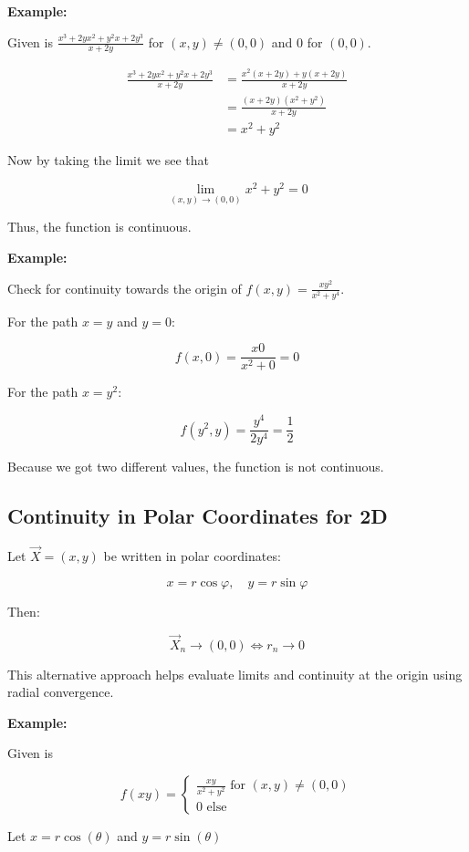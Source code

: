 \textbf{Example:}

Given is \(\frac{x^3 + 2yx^2 + y^2x + 2y^3}{x + 2y}\) for \((x,y) \ne (0,0)\) and \(0\) for \((0,0)\).

\begin{align*}
    \frac{x^3 + 2yx^2 + y^2x + 2y^3}{x + 2y} &= \frac{x^2(x + 2y) + y(x + 2y)}{x + 2y}\\
    &= \frac{(x + 2y)(x^2 + y^2)}{x + 2y}\\
    &= x^2 + y^2
\end{align*}

Now by taking the limit we see that

\[
    \lim_{(x,y) \to (0,0)} x^2 + y^2 = 0
\]

Thus, the function is continuous.

\textbf{Example:}

Check for continuity towards the origin of \(f(x,y) =\frac{xy^2}{x^2 + y^4}\).

For the path \(x = y\) and \(y = 0\):

\[
    f(x,0) = \frac{x0}{x^2 + 0} = 0
\]

For the path \(x = y^2\):

\[
    f(y^2, y) = \frac{y^4}{2y^4} = \frac{1}{2}
\]

Because we got two different values, the function is not continuous.

\subsection{Continuity in Polar Coordinates for 2D}

Let \( \vec{X} = (x, y) \) be written in polar coordinates:

\[
    x = r \cos \varphi, \quad y = r \sin \varphi
\]

Then:

\[
    \vec{X}_n \to (0, 0) \iff r_n \to 0
\]

This alternative approach helps evaluate limits and continuity at the origin using radial convergence.

\textbf{Example:}

Given is 

\[
    f(xy) = 
    \begin{cases}   
    \frac{xy}{x^2 + y^2} \text{ for } (x,y) \ne (0,0) \\ 
    0 \text{ else }
    \end{cases}
\]

Let \(x = r\cos(\theta)\) and \(y = r\sin(\theta)\)

